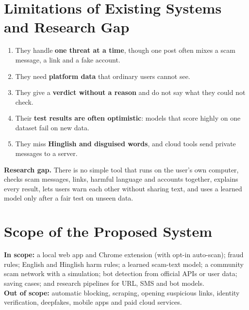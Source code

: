 \section{Limitations of Existing Systems and Research Gap}
\begin{enumerate}
\item They handle \textbf{one threat at a time}, though one post often mixes a scam message, a link and a fake account.
\item They need \textbf{platform data} that ordinary users cannot see.
\item They give a \textbf{verdict without a reason} and do not say what they could not check.
\item Their \textbf{test results are often optimistic}: models that score highly on one dataset fail on new data.
\item They miss \textbf{Hinglish and disguised words}, and cloud tools send private messages to a server.
\end{enumerate}

\noindent\textbf{Research gap.} There is no simple tool that runs on the user's own computer, checks scam messages, links, harmful language and accounts together, explains every result, lets users warn each other without sharing text, and uses a learned model only after a fair test on unseen data.

\section{Scope of the Proposed System}
\noindent\textbf{In scope:} a local web app and Chrome extension (with opt-in auto-scan); fraud rules; English and Hinglish harm rules; a learned scam-text model; a community scam network with a simulation; bot detection from official APIs or user data; saving cases; and research pipelines for URL, SMS and bot models.\\

\noindent\textbf{Out of scope:} automatic blocking, scraping, opening suspicious links, identity verification, deepfakes, mobile apps and paid cloud services.

